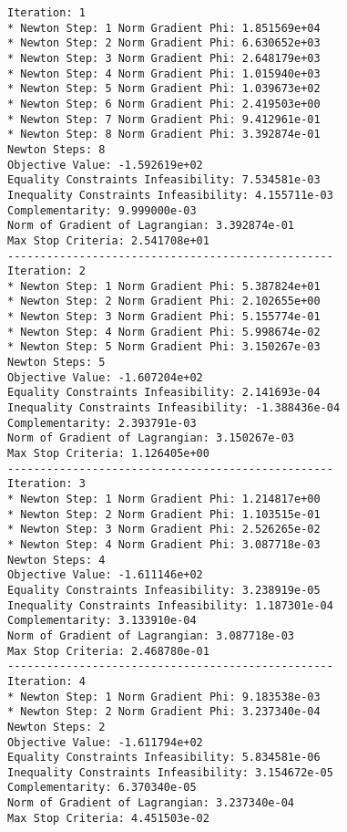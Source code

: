 \documentclass{article}
\begin{document}
\scriptsize
\begin{minipage}[t]{0.45\textwidth}
\begin{verbatim}
Iteration: 1
* Newton Step: 1 Norm Gradient Phi: 1.851569e+04
* Newton Step: 2 Norm Gradient Phi: 6.630652e+03
* Newton Step: 3 Norm Gradient Phi: 2.648179e+03
* Newton Step: 4 Norm Gradient Phi: 1.015940e+03
* Newton Step: 5 Norm Gradient Phi: 1.039673e+02
* Newton Step: 6 Norm Gradient Phi: 2.419503e+00
* Newton Step: 7 Norm Gradient Phi: 9.412961e-01
* Newton Step: 8 Norm Gradient Phi: 3.392874e-01
Newton Steps: 8
Objective Value: -1.592619e+02
Equality Constraints Infeasibility: 7.534581e-03
Inequality Constraints Infeasibility: 4.155711e-03
Complementarity: 9.999000e-03
Norm of Gradient of Lagrangian: 3.392874e-01
Max Stop Criteria: 2.541708e+01
--------------------------------------------------
Iteration: 2
* Newton Step: 1 Norm Gradient Phi: 5.387824e+01
* Newton Step: 2 Norm Gradient Phi: 2.102655e+00
* Newton Step: 3 Norm Gradient Phi: 5.155774e-01
* Newton Step: 4 Norm Gradient Phi: 5.998674e-02
* Newton Step: 5 Norm Gradient Phi: 3.150267e-03
Newton Steps: 5
Objective Value: -1.607204e+02
Equality Constraints Infeasibility: 2.141693e-04
Inequality Constraints Infeasibility: -1.388436e-04
Complementarity: 2.393791e-03
Norm of Gradient of Lagrangian: 3.150267e-03
Max Stop Criteria: 1.126405e+00
--------------------------------------------------
Iteration: 3
* Newton Step: 1 Norm Gradient Phi: 1.214817e+00
* Newton Step: 2 Norm Gradient Phi: 1.103515e-01
* Newton Step: 3 Norm Gradient Phi: 2.526265e-02
* Newton Step: 4 Norm Gradient Phi: 3.087718e-03
Newton Steps: 4
Objective Value: -1.611146e+02
Equality Constraints Infeasibility: 3.238919e-05
Inequality Constraints Infeasibility: 1.187301e-04
Complementarity: 3.133910e-04
Norm of Gradient of Lagrangian: 3.087718e-03
Max Stop Criteria: 2.468780e-01
--------------------------------------------------
Iteration: 4
* Newton Step: 1 Norm Gradient Phi: 9.183538e-03
* Newton Step: 2 Norm Gradient Phi: 3.237340e-04
Newton Steps: 2
Objective Value: -1.611794e+02
Equality Constraints Infeasibility: 5.834581e-06
Inequality Constraints Infeasibility: 3.154672e-05
Complementarity: 6.370340e-05
Norm of Gradient of Lagrangian: 3.237340e-04
Max Stop Criteria: 4.451503e-02
\end{verbatim}
\end{minipage}
\end{document}
